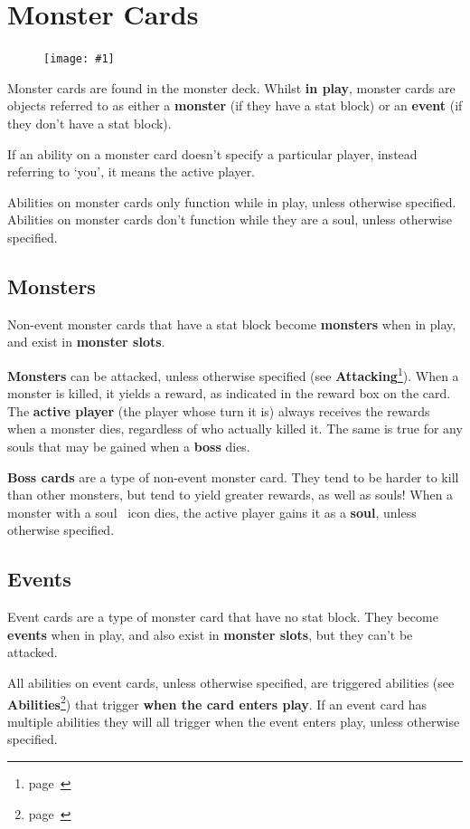 \documentclass[
  fontsize=10pt,
  paper=a5,
  version=last,
  chapterprefix=true,
  bindingoffset=5mm,
  ]{scrbook}
\newcommand*{\inlineicon}[1]{%
    \raisebox{-.3\baselineskip}{%
        \smash{%
            \texttt{[image: \#1]}%
        }%
    }%
}
\newcommand{\soul}{\inlineicon{./assets/ms-soul.png}}
\newcommand{\cardw}{0.3\textwidth}
\newcommand{\cardfigv}[1]{
    \begin{figure}
        \texttt{[image: \#1]}
    \end{figure}
}
\begin{document}
    \section{Monster Cards}
    \cardfigv{assets/monster.png}
    Monster cards are found in the monster deck. Whilst \textbf{in play}, monster cards are objects referred to as either a \textbf{monster} (if they have a stat block) or an \textbf{event} (if they don’t have a stat block).

    If an ability on a monster card doesn’t specify a particular player, instead referring to ‘you’, it means the active player.

    Abilities on monster cards only function while in play, unless otherwise specified. Abilities on monster cards don’t function while they are a soul, unless otherwise specified.

    \subsection{Monsters}
    Non-event monster cards that have a stat block become \textbf{monsters} when in play, and exist in \textbf{monster slots}.

    \textbf{Monsters} can be attacked, unless otherwise specified (see \textbf{Attacking}\footnote{page~\pageref{attacking}}).
    When a monster is killed, it yields a reward, as indicated in the reward box on the card. The \textbf{active player} (the player whose turn it is) always receives the rewards when a monster dies, regardless of who actually killed it. The same is true for any souls that may be gained when a \textbf{boss} dies.

    \textbf{Boss cards} are a type of non-event monster card. They tend to be harder to kill than other monsters, but tend to yield greater rewards, as well as souls! When a monster with a soul\soul\ icon dies, the active player gains it as a \textbf{soul}, unless otherwise specified.

    \subsection{Events}
    Event cards are a type of monster card that have no stat block. They become \textbf{events} when in play, and also exist in \textbf{monster slots}, but they can’t be attacked.

    All abilities on event cards, unless otherwise specified, are triggered abilities (see \textbf{Abilities}\footnote{page~\pageref{abilities}}) that trigger \textbf{when the card enters play}. If an event card has multiple abilities they will all trigger when the event enters play, unless otherwise specified.
\end{document}
